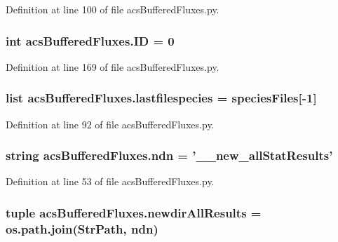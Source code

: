 Definition at line 100 of file acs\-Buffered\-Fluxes.\-py.

\hypertarget{a00098_a111fff157346d1e3888a229584206d0a}{
\subsubsection[{I\-D}]{\setlength{\rightskip}{0pt plus 5cm}int acs\-Buffered\-Fluxes.\-I\-D = 0}}\label{a00098_a111fff157346d1e3888a229584206d0a}


Definition at line 169 of file acs\-Buffered\-Fluxes.\-py.

\hypertarget{a00098_a887b4124ed717643d4e79b6d9597109f}{
\subsubsection[{lastfilespecies}]{\setlength{\rightskip}{0pt plus 5cm}list acs\-Buffered\-Fluxes.\-lastfilespecies = {\bf species\-Files}\mbox{[}-\/1\mbox{]}}}\label{a00098_a887b4124ed717643d4e79b6d9597109f}


Definition at line 92 of file acs\-Buffered\-Fluxes.\-py.

\hypertarget{a00098_a5df7e71a36351afd3e59d6f50a94bdaf}{
\subsubsection[{ndn}]{\setlength{\rightskip}{0pt plus 5cm}string acs\-Buffered\-Fluxes.\-ndn = '\-\_\-\_\-new\-\_\-all\-Stat\-Results'}}\label{a00098_a5df7e71a36351afd3e59d6f50a94bdaf}


Definition at line 53 of file acs\-Buffered\-Fluxes.\-py.

\hypertarget{a00098_ae53bd92b0509a8f35e92e734a7f4b4e1}{
\subsubsection[{newdir\-All\-Results}]{\setlength{\rightskip}{0pt plus 5cm}tuple acs\-Buffered\-Fluxes.\-newdir\-All\-Results = os.\-path.\-join(Str\-Path, {\bf ndn})}}\label{a00098_ae53bd92b0509a8f35e92e734a7f4b4e1}


